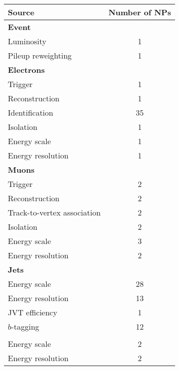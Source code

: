 \begin{tabular}{l c}
    \toprule
    Source & Number of NPs \\
    \midrule
    \textbf{Event} & \\
    \midrule
    Luminosity \cite{ATLAS-CONF-2019-021} & 1 \\
    Pileup reweighting & 1 \\
    \midrule
    \textbf{Electrons} \cite{EGAM-2018-01} & \\
    \midrule
    Trigger \cite{TRIG-2018-05} & 1 \\
    Reconstruction & 1 \\
    Identification & 35 \\
    Isolation & 1 \\
    Energy scale & 1 \\
    Energy resolution & 1 \\
    \midrule
    \textbf{Muons} \cite{MUON-2018-03} & \\
    \midrule
    Trigger \cite{TRIG-2018-01} & 2 \\
    Reconstruction & 2 \\
    Track-to-vertex association & 2 \\
    Isolation & 2 \\
    Energy scale & 3 \\
    Energy resolution & 2 \\
    \midrule
    \textbf{Jets} \cite{JETM-2018-05} & \\
    \midrule
    Energy scale & 28 \\
    Energy resolution & 13 \\
    JVT efficiency \cite{ATLAS-CONF-2014-018} & 1 \\
    $b$-tagging \cite{FTAG-2018-01} & 12 \\
    \midrule
    \pmb{\MET} \cite{PERF-2016-07} & \\
    \midrule
    Energy scale & 2 \\
    Energy resolution & 2 \\
    \bottomrule
\end{tabular}

